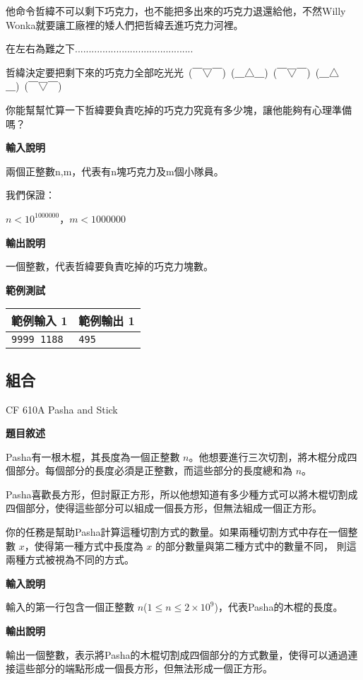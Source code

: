     他命令哲緯不可以剩下巧克力，也不能把多出來的巧克力退還給他，不然Willy Wonka就要讓工廠裡的矮人們把哲緯丟進巧克力河裡。

    在左右為難之下...........................................

    哲緯決定要把剩下來的巧克力全部吃光光~(￣▽￣)~(＿△＿)~(￣▽￣)~(＿△＿)~(￣▽￣)~

    你能幫幫忙算一下哲緯要負責吃掉的巧克力究竟有多少塊，讓他能夠有心理準備嗎？

    \textbf{輸入說明}

    兩個正整數n,m，代表有n塊巧克力及m個小隊員。

    我們保證：

    $n<10^1000000$，$m<1000000$

    \textbf{輸出說明}

    一個整數，代表哲緯要負責吃掉的巧克力塊數。

    \textbf{範例測試}

    \begin{tabular}{|m{7cm}|m{7cm}|}
        \hline
        範例輸入 1 & 範例輸出 1 \\
        \hline
        \verb|9999 1188| & \verb|495| \\
        \hline
    \end{tabular}

    \subsection{組合}

    \problem CF 610A Pasha and Stick

    \textbf{題目敘述}

    Pasha有一根木棍，其長度為一個正整數 $n$。他想要進行三次切割，將木棍分成四個部分。每個部分的長度必須是正整數，而這些部分的長度總和為 $n$。

    Pasha喜歡長方形，但討厭正方形，所以他想知道有多少種方式可以將木棍切割成四個部分，使得這些部分可以組成一個長方形，但無法組成一個正方形。

    你的任務是幫助Pasha計算這種切割方式的數量。如果兩種切割方式中存在一個整數 $x$，使得第一種方式中長度為 $x$ 的部分數量與第二種方式中的數量不同，
    則這兩種方式被視為不同的方式。

    \textbf{輸入說明}

    輸入的第一行包含一個正整數 $n$($1 \leq n \leq 2 \times 10^9$)，代表Pasha的木棍的長度。

    \textbf{輸出說明}

    輸出一個整數，表示將Pasha的木棍切割成四個部分的方式數量，使得可以通過連接這些部分的端點形成一個長方形，但無法形成一個正方形。

